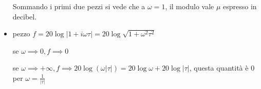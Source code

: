 \begin{itemize}
\begin{figure}[htpb]
\begin{tikzpicture}[x=0.75pt,y=0.75pt,yscale=-1,xscale=1]
	      		
	      	\end{tikzpicture}
	      \end{figure}\FloatBarrier
	      
	      
	      Sommando i primi due pezzi si vede che a $\omega =1$, il modulo vale $\mu $ espresso in decibel.
	\item pezzo ${\textstyle f=20\log| 1+i\omega \tau | =20\log\sqrt{1+\omega ^2 \tau ^2}}$
	      
	      se $\omega \implies 0,f\implies 0$
	      
	      se $\omega \implies +\infty ,f\implies 20\log(\omega | \tau |) =20\log \omega +20\log| \tau | $, questa quantità è $0$ per $\omega =\frac{1}{| \tau | }$
	      
	      \begin{figure}[htpb]\centering
	      	
	      	\begin{tikzpicture}[x=0.75pt,y=0.75pt,yscale=-1,xscale=1]
	      		

\end{tikzpicture}
\end{figure}
\end{itemize}
